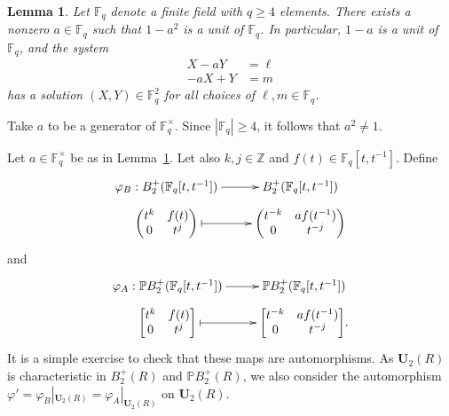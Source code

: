 \documentclass[a4paper,11pt]{amsart}
\makeatletter
\numberwithin{equation}{section}
\theoremstyle{plain}
\newtheorem{lem}[thm]{Lemma}
\theoremstyle{definition}
\renewenvironment{proof}[1][\proofname] {\par\pushQED{\qed}\normalfont\topsep6\p@\@plus6\p@\relax\trivlist\item[\hskip\labelsep\bfseries#1\@addpunct{.}]\ignorespaces}{\popQED\endtrivlist\@endpefalse}
\newcommand{\Z}{\mathbb{Z}}
\newcommand{\F}{\mathbb{F}}
\newcommand{\mbU}{\mathbf{U}} %
\newcommand{\PBplus}{\mathbb{P}B^{+}} %
\newcommand{\phee}{\varphi} %
\makeatother
\begin{document}
\begin{lem}\label{lemmaa} Let $\F_q$ denote a finite field with $q \geq 4$ elements. There exists a nonzero $a \in \F_q$ such that $1-a^2$ is a unit of $\F_q$. In particular, $1-a$ is a unit of $\F_q$, and the system
\begin{align*} X-aY&=\ell\\
			  -aX+Y&=m
\end{align*}
has a solution $(X,Y) \in \F_{q}^{2}$ for all choices of $\ell, m \in \F_q$.
\end{lem}
\begin{proof} Take $a$ to be a generator of $\F_{q}^{\times}$. Since $|\F_q|\geq 4$, it follows that $a^2\neq 1$.  
\end{proof}

Let $a\in \F_{q}^{\times}$ be as in Lemma~\ref{lemmaa}. Let also $k,j \in \Z$ and $f(t) \in \F_q[t,t^{-1}]$. Define 
\[ 
\xymatrix@R=2mm{ \phee_{B} : B_2^+(\F_q[t,t^{-1}]) \ar[r] & B_2^+(\F_q[t,t^{-1}]) \\ 
{\begin{pmatrix} t^k & f(t) \\ 0 & t^j \end{pmatrix}} \ar@{|->}[r] & {\begin{pmatrix} t^{-k} & af(t^{-1}) \\ 0 & t^{-j} \end{pmatrix}}} 
\]
and 
\[ 
\xymatrix@R=2mm{ \phee_{A} : \PBplus_2(\F_q[t,t^{-1}]) \ar[r] & \PBplus_2(\F_q[t,t^{-1}]) \\ 
{\begin{bmatrix} t^k & f(t) \\ 0 & t^j \end{bmatrix}} \ar@{|->}[r] & {\begin{bmatrix} t^{-k} & af(t^{-1}) \\ 0 & t^{-j} \end{bmatrix}}.} 
\]
It is a simple exercise to check that these maps are automorphisms. As $\mbU_2(R)$ is characteristic in $B_2^+(R)$ and $\PBplus_2(R)$, we also consider the automorphism  $\phee'= \phee_{B}|_{\mbU_2(R)}=\phee_{A}|_{\mbU_2(R)}$ on $\mbU_2(R)$.
\end{document}

